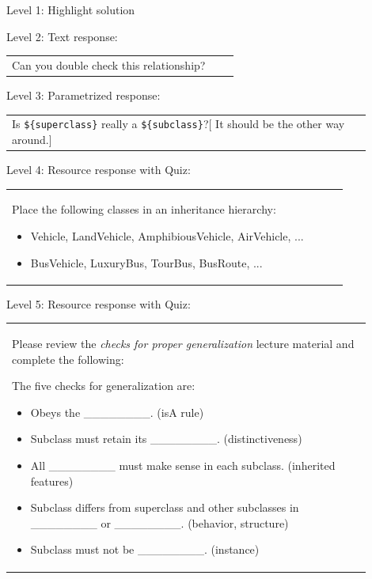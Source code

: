 \noindent Level 1: Highlight solution  \medskip

\noindent Level 2: Text response: \medskip

\begin{tabular}{|p{0.9\linewidth}}
Can you double check this relationship?
\end{tabular} \medskip

\noindent Level 3: Parametrized response: \medskip

\begin{tabular}{|p{0.9\linewidth}}
Is \verb|${superclass}| really a \verb|${subclass}|?[ It should be the other way around.]
\end{tabular} \medskip

\noindent Level 4: Resource response with Quiz: \medskip

\begin{tabular}{|p{0.9\linewidth}}
Place the following classes in an inheritance hierarchy:

\begin{itemize}
    \item Vehicle, LandVehicle, AmphibiousVehicle, AirVehicle, ...
    \item BusVehicle, LuxuryBus, TourBus, BusRoute, ...
\end{itemize}

\end{tabular} \medskip

\noindent Level 5: Resource response with Quiz: \medskip

\begin{tabular}{|p{0.9\linewidth}}
Please review the \textit{checks for proper generalization} lecture material
and complete the following:

The five checks for generalization are:
\begin{itemize}
    \item Obeys the \_\_\_\_\_\_\_\_. (isA rule)
    \item Subclass must retain its \_\_\_\_\_\_\_\_. (distinctiveness)
    \item All \_\_\_\_\_\_\_\_ must make sense in each subclass. (inherited features)
    \item Subclass differs from superclass and other subclasses in \_\_\_\_\_\_\_\_ or \_\_\_\_\_\_\_\_. (behavior, structure)
    \item Subclass must not be \_\_\_\_\_\_\_\_. (instance)
\end{itemize}

\end{tabular} \medskip

